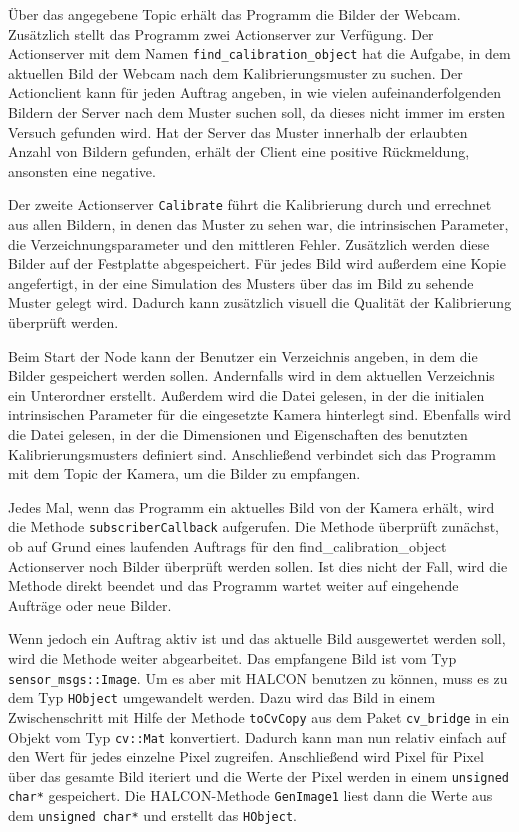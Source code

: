 Über das angegebene Topic erhält das Programm die Bilder der Webcam. Zusätzlich stellt das Programm zwei Actionserver zur Verfügung. Der Actionserver mit dem Namen \texttt{find\_calibration\_object} hat die Aufgabe, in dem aktuellen Bild der Webcam nach dem Kalibrierungsmuster zu suchen. Der Actionclient kann für jeden Auftrag angeben, in wie vielen aufeinanderfolgenden Bildern der Server nach dem Muster suchen soll, da dieses nicht immer im ersten Versuch gefunden wird. Hat der Server das Muster innerhalb der erlaubten Anzahl von Bildern gefunden, erhält der Client eine positive Rückmeldung, ansonsten eine negative.

Der zweite Actionserver \texttt{Calibrate} führt die Kalibrierung durch und errechnet aus allen Bildern, in denen das Muster zu sehen war, die intrinsischen Parameter, die Verzeichnungsparameter und den mittleren Fehler. Zusätzlich werden diese Bilder auf der Festplatte abgespeichert. Für jedes Bild wird außerdem eine Kopie angefertigt, in der eine Simulation des Musters über das im Bild zu sehende Muster gelegt wird. Dadurch kann zusätzlich visuell die Qualität der Kalibrierung überprüft werden.

Beim Start der Node kann der Benutzer ein Verzeichnis angeben, in dem die Bilder gespeichert werden sollen. Andernfalls wird in dem aktuellen Verzeichnis ein Unterordner erstellt. Außerdem wird die Datei gelesen, in der die initialen intrinsischen Parameter für die eingesetzte Kamera hinterlegt sind. Ebenfalls wird die Datei gelesen, in der die Dimensionen und Eigenschaften des benutzten Kalibrierungsmusters definiert sind. Anschließend verbindet sich das Programm mit dem Topic der Kamera, um die Bilder zu empfangen.

Jedes Mal, wenn das Programm ein aktuelles Bild von der Kamera erhält, wird die Methode \texttt{subscriberCallback} aufgerufen. Die Methode überprüft zunächst, ob auf Grund eines laufenden Auftrags für den find\_calibration\_object Actionserver noch Bilder überprüft werden sollen. Ist dies nicht der Fall, wird die Methode direkt beendet und das Programm wartet weiter auf eingehende Aufträge oder neue Bilder. 

Wenn jedoch ein Auftrag aktiv ist und das aktuelle Bild ausgewertet werden soll, wird die Methode weiter abgearbeitet. Das empfangene Bild ist vom Typ \texttt{sensor\_msgs::Image}. Um es aber mit HALCON benutzen zu können, muss es zu dem Typ \texttt{HObject} umgewandelt werden. Dazu wird das Bild in einem Zwischenschritt mit Hilfe der Methode \texttt{toCvCopy} aus dem Paket \texttt{cv\_bridge} in ein Objekt vom Typ \texttt{cv::Mat} konvertiert. Dadurch kann man nun relativ einfach auf den Wert für jedes einzelne Pixel zugreifen. Anschließend wird Pixel für Pixel über das gesamte Bild iteriert und die Werte der Pixel werden in einem \texttt{unsigned char*} gespeichert. Die HALCON-Methode \texttt{GenImage1} liest dann die Werte aus dem \texttt{unsigned char*} und erstellt das \texttt{HObject}.

